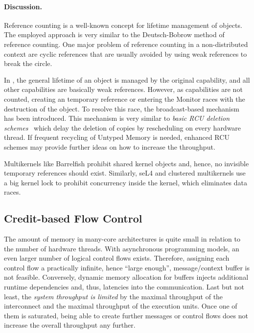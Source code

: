 \paragraph{Discussion.}
Reference counting is a well-known concept for lifetime management of objects. The employed approach is very similar to the Deutsch-Bobrow method of reference counting.
One major problem of reference counting in a non-distributed context are cyclic references that are usually avoided by using weak references to break the circle.

In \mythos, the general lifetime of an object is managed by the original capability, and all other capabilities are basically weak references. However, as capabilities are not counted, creating an temporary reference or entering the Monitor races with the destruction of the object.
%
To resolve this race, the broadcast-based mechanism has been introduced.
This mechanism is very similar to \emph{basic RCU deletion schemes}~\cite{McKenney2004, McKenneyWalpole2007} which delay the deletion of copies by rescheduling on every hardware thread. If frequent recycling of Untyped Memory is needed, enhanced RCU schemes may provide further ideas on how to increase the throughput.

Multikernels like Barrelfish prohibit shared kernel objects and, hence, no invisible temporary references should exist. Similarly, seL4 and clustered multikernels use a big kernel lock to prohibit concurrency inside the kernel, which eliminates data races.

\subsection{Credit-based Flow Control}
\label{sec:credit-flow-dyn}

The amount of memory in many-core architectures is quite small in relation to the number of hardware threads. With asynchronous programming models, an even larger number of logical control flows exists.
Therefore, assigning each control flow a practically infinite, hence ``large enough'', message/context buffer is not feasible. Conversely, dynamic memory allocation for buffers injects additional runtime dependencies  and, thus, latencies into the communication.
Last but not least, the \emph{system throughput is limited} by the maximal throughput of the interconnect and the maximal throughput of the execution units. Once one of them is saturated, being able to create further messages or control flows does not increase the overall throughput any further.

